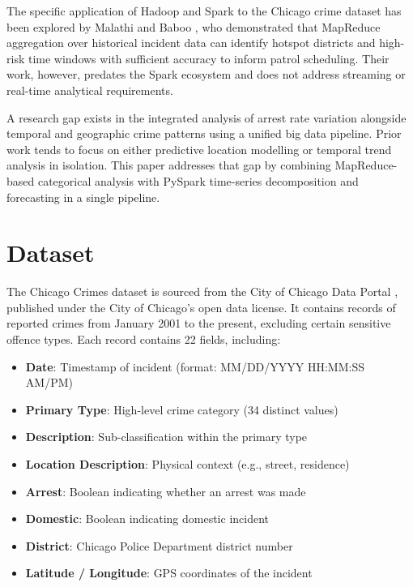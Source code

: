 \documentclass[conference]{IEEEtran}
\begin{document}
The specific application of Hadoop and Spark to the Chicago crime dataset has been
explored by Malathi and Baboo \cite{malathi2011}, who demonstrated that MapReduce
aggregation over historical incident data can identify hotspot districts and high-risk
time windows with sufficient accuracy to inform patrol scheduling. Their work, however,
predates the Spark ecosystem and does not address streaming or real-time analytical
requirements.

A research gap exists in the integrated analysis of arrest rate variation alongside
temporal and geographic crime patterns using a unified big data pipeline. Prior work
tends to focus on either predictive location modelling or temporal trend analysis in
isolation. This paper addresses that gap by combining MapReduce-based categorical
analysis with PySpark time-series decomposition and forecasting in a single pipeline.

\section{Dataset}

The Chicago Crimes dataset is sourced from the City of Chicago Data Portal
\cite{chicagoportal}, published under the City of Chicago's open data license. It
contains records of reported crimes from January 2001 to the present, excluding
certain sensitive offence types. Each record contains 22 fields, including:

\begin{itemize}
    \item \textbf{Date}: Timestamp of incident (format: MM/DD/YYYY HH:MM:SS AM/PM)
    \item \textbf{Primary Type}: High-level crime category (34 distinct values)
    \item \textbf{Description}: Sub-classification within the primary type
    \item \textbf{Location Description}: Physical context (e.g., street, residence)
    \item \textbf{Arrest}: Boolean indicating whether an arrest was made
    \item \textbf{Domestic}: Boolean indicating domestic incident
    \item \textbf{District}: Chicago Police Department district number
    \item \textbf{Latitude / Longitude}: GPS coordinates of the incident
\end{itemize}
\end{document}
